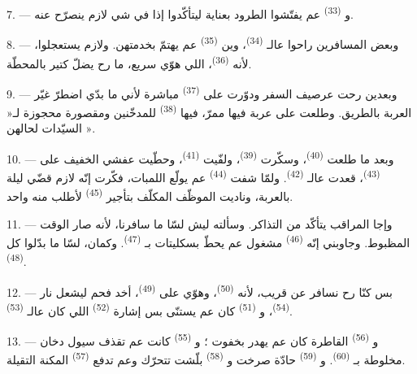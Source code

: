 7. --- و \textsuperscript{(33)} عم يفتّشوا الطرود
بعناية ليتأكّدوا إذا في شي لازم ينصرّح عنه.

8. --- وبعض المسافرين راحوا عالـ \textsuperscript{(34)}،
وين  \textsuperscript{(35)} عم يهتمّ بخدمتهن. ولازم
يستعجلوا، لأنه  \textsuperscript{(36)}، اللي هوّي سريع، ما
رح يضلّ كتير بالمحطّة.

9. --- وبعدين رحت عرصيف السفر ودوّرت على 
\textsuperscript{(37)} مباشرة لأني ما بدّي اضطرّ غيّر العربة بالطريق.
وطلعت على عربة فيها ممرّ، فيها  \textsuperscript{(38)}
للمدخّنين ومقصورة محجوزة لـ« السيّدات لحالهن ».

\VUsaut{3.0mm}

10. --- وبعد ما طلعت  \textsuperscript{(40)}، وسكّرت
 \textsuperscript{(39)}، ولفّيت 
\textsuperscript{(41)}، وحطّيت عفشي الخفيف على 
\textsuperscript{(43)}، قعدت عالـ \textsuperscript{(42)}. ولمّا
شفت  \textsuperscript{(44)} عم يولّع اللمبات، فكّرت
إنّه لازم قضّي ليلة بالعربة، وناديت الموظّف المكلّف بتأجير
 \textsuperscript{(45)} لأطلب منه واحد.

11. --- وإجا المراقب يتأكّد من التذاكر. وسألته ليش لسّا ما سافرنا،
لأنه صار الوقت المظبوط. وجاوبني إنّه 
\textsuperscript{(46)} مشغول عم يحطّ بسكليتات بـ
\textsuperscript{(47)}. وكمان، لسّا ما بدّلوا كل 
\textsuperscript{(48)}.

12. --- بس كنّا رح نسافر عن قريب، لأنه 
\textsuperscript{(50)}، وهوّي على  \textsuperscript{(49)}،
أخد فحم ليشعل نار  \textsuperscript{(54)}،
و \textsuperscript{(51)} كان عم يستنّى بس إشارة  \textsuperscript{(52)} اللي كان عالـ
\textsuperscript{(53)}.

13. --- و \textsuperscript{(56)} القاطرة كان عم يهدر بخفوت ؛
و \textsuperscript{(55)} كانت عم تقذف سيول دخان مخلوطة
بـ \textsuperscript{(60)}. و
\textsuperscript{(59)} حادّة صرخت و \textsuperscript{(58)}
بلّشت تتحرّك وعم تدفع  \textsuperscript{(57)} المكنة
التقيلة.

\VUsaut{3.0mm}
\VUsaut{3.0mm}

